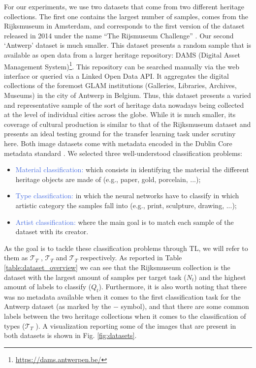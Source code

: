 For our experiments, we use two datasets that come from two different heritage collections. The first one contains the largest number of samples, comes from the Rijksmuseum in Amsterdam, and corresponds to the first version of the dataset released in 2014 under the name ``The Rijsmuseum Challenge'' \cite{mensink2014rijksmuseum}. Our second `Antwerp' dataset is much smaller. This dataset presents a random sample that is available as open data from a larger heritage repository: DAMS (Digital Asset Management System)\footnote{\url{https://dams.antwerpen.be/}}. This repository can be searched manually via the web interface or queried via a Linked Open Data API. It aggregates the digital collections of the foremost GLAM institutions  (Galleries, Libraries, Archives, Museums) in the city of Antwerp in Belgium. Thus, this dataset presents a varied and representative sample of the sort of heritage data nowadays being collected at the level of individual cities across the globe. While it is much smaller, its coverage of cultural production is similar to that of the Rijksmuseum dataset and presents an ideal testing ground for the transfer learning task under scrutiny here. Both image datasets come with metadata encoded in the Dublin Core metadata standard \cite{weibel1998dublin}. We selected three well-understood classification problems:
\begin{itemize}
	\item \textcolor{RoyalBlue}{Material classification:} which consists in identifying the material the different heritage objects are made of (e.g., paper, gold, porcelain, ...); 
	\item \textcolor{RoyalBlue}{Type classification:} in which the neural networks have to classify in which artistic category the samples fall into (e.g., print, sculpture, drawing, ...);
	\item \textcolor{RoyalBlue}{Artist classification:} where the main goal is to match each sample of the dataset with its creator.
\end{itemize}

As the goal is to tackle these classification problems through TL, we will refer to them as $\mathcal{T}_T$ , $\mathcal{T}_T$  and $\mathcal{T}_T$  respectively. As reported in Table \ref{table:dataset_overview} we can see that the Rijksmuseum collection is the dataset with the largest amount of samples per target task ($N_t$) and the highest amount of labels to classify ($Q_t$). Furthermore, it is also worth noting that there was no metadata available when it comes to the first classification task for the Antwerp dataset (as marked by the $-$ symbol), and that there are some common labels between the two heritage collections when it comes to the classification of types ($\mathcal{T}_T$ ). A visualization reporting some of the images that are present in both datasets is shown in Fig. \ref{fig:datasets}.


